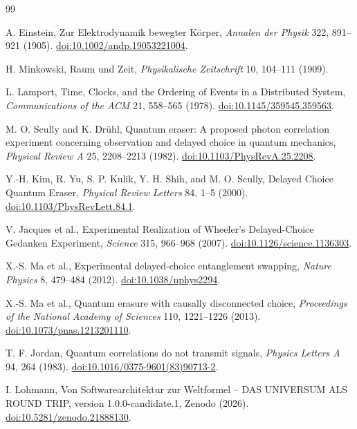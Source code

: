 \documentclass[11pt]{article}
\theoremstyle{remark}
\begin{document}
\begin{thebibliography}{99}

A. Einstein, Zur Elektrodynamik bewegter K\"orper, \emph{Annalen der
Physik} 322, 891--921 (1905).
\href{https://doi.org/10.1002/andp.19053221004}{doi:10.1002/andp.19053221004}.

H. Minkowski, Raum und Zeit, \emph{Physikalische Zeitschrift} 10,
104--111 (1909).

L. Lamport, Time, Clocks, and the Ordering of Events in a Distributed
System, \emph{Communications of the ACM} 21, 558--565 (1978).
\href{https://doi.org/10.1145/359545.359563}{doi:10.1145/359545.359563}.

M. O. Scully and K. Dr\"uhl, Quantum eraser: A proposed photon correlation
experiment concerning observation and delayed choice in quantum mechanics,
\emph{Physical Review A} 25, 2208--2213 (1982).
\href{https://doi.org/10.1103/PhysRevA.25.2208}{doi:10.1103/PhysRevA.25.2208}.

Y.-H. Kim, R. Yu, S. P. Kulik, Y. H. Shih, and M. O. Scully, Delayed
Choice Quantum Eraser, \emph{Physical Review Letters} 84, 1--5 (2000).
\href{https://doi.org/10.1103/PhysRevLett.84.1}{doi:10.1103/PhysRevLett.84.1}.

V. Jacques et al., Experimental Realization of Wheeler's Delayed-Choice
Gedanken Experiment, \emph{Science} 315, 966--968 (2007).
\href{https://doi.org/10.1126/science.1136303}{doi:10.1126/science.1136303}.

X.-S. Ma et al., Experimental delayed-choice entanglement swapping,
\emph{Nature Physics} 8, 479--484 (2012).
\href{https://doi.org/10.1038/nphys2294}{doi:10.1038/nphys2294}.

X.-S. Ma et al., Quantum erasure with causally disconnected choice,
\emph{Proceedings of the National Academy of Sciences} 110, 1221--1226
(2013). \href{https://doi.org/10.1073/pnas.1213201110}{doi:10.1073/pnas.1213201110}.

T. F. Jordan, Quantum correlations do not transmit signals,
\emph{Physics Letters A} 94, 264 (1983).
\href{https://doi.org/10.1016/0375-9601(83)90713-2}{doi:10.1016/0375-9601(83)90713-2}.

I. Lohmann, Von Softwarearchitektur zur Weltformel -- DAS UNIVERSUM ALS
ROUND TRIP, version 1.0.0-candidate.1, Zenodo (2026).
\href{https://doi.org/10.5281/zenodo.21888130}{doi:10.5281/zenodo.21888130}.

\end{thebibliography}
\end{document}
